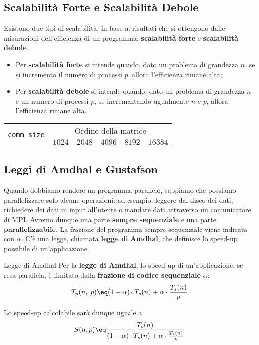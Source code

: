 \subsection{Scalabilità Forte e Scalabilità Debole}

Esistono due tipi di scalabilità, in base ai risultati che si ottengono dalle misurazioni dell'efficienza di un programma: \textbf{scalabilità forte} e \textbf{scalabilità debole}.

\begin{itemize}
    \item Per \textbf{scalabilità forte} si intende quando, dato un problema di grandezza $n$, se si incrementa il numero di processi $p$, allora l'efficienza rimane alta;
    \item Per \textbf{scalabilità debole} si intende quando, dato un problema di grandezza $n$ e un numero di processi $p$, se incrementando ugualmente $n$ e $p$, allora l'efficienza rimane alta.
\end{itemize}

\begin{center}
    \begin{tabular}{|c||c|c|c|c|c|}
        \hline
        \multirow{2}{*}{ \texttt{comm\_size} } & \multicolumn{5}{c|}{Ordine della matrice} \\
         & $1024$ & $2048$ & $4096$ & $8192$ & $16384$ \\
        \hline\hline
    \end{tabular}
\end{center}


\subsection{Leggi di Amdhal e Gustafson}

Quando dobbiamo rendere un programma parallelo, sappiamo che possiamo parallelizzare solo alcune operazioni: ad esempio, leggere dal disco dei dati, richiedere dei dati in input all'utente o mandare dati attraverso un comunicatore di MPI. Avremo dunque una parte \textbf{sempre sequenziale} e una parte \textbf{parallelizzabile}. La frazione del programma sempre sequenziale viene indicata con $\alpha$. C'è una legge, chiamata \textbf{legge di Amdhal}, che definisce lo speed-up possibile di un'applicazione.

\begin{definition}{Legge di Amdhal}
    Per la \textbf{legge di Amdhal}, lo speed-up di un'applicazione, se resa parallela, è limitato dalla \textbf{frazione di codice sequenziale} $\alpha$:
    \[ T_p(n, \; p) \eq (1 - \alpha) \cdot T_s(n) + \alpha \cdot \frac{T_s(n)}{p} \]

    Lo speed-up calcolabile sarà dunque uguale a
    \[ S(n, p) \eq \frac{T_s(n)}{(1 - \alpha) \cdot T_s(n) + \alpha \cdot \frac{T_s(n)}{p}} \]
\end{definition}

